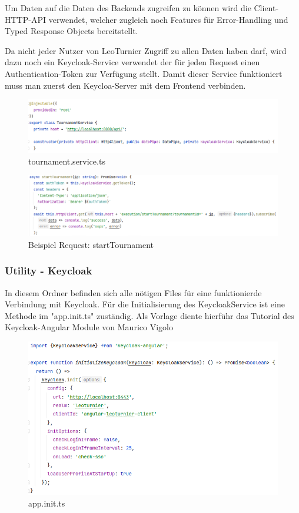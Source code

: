 Um Daten auf die Daten des Backends zugreifen zu können wird die Client-HTTP-API verwendet, welcher zugleich noch Features für Error-Handling und Typed Response Objects  bereitstellt. \cite{implementation-angular-4}

Da nicht jeder Nutzer von LeoTurnier Zugriff zu allen Daten haben darf, wird dazu noch ein Keycloak-Service verwendet der für jeden Request einen Authentication-Token zur Verfügung stellt.
Damit dieser Service funktioniert muss man zuerst den Keycloa-Server mit dem Frontend verbinden.

\begin{figure}[H]
    \includegraphics[scale=0.6]{pics/frontend/service.PNG}
    \caption{tournament.service.ts}
\end{figure}

\begin{figure}[H]
    \includegraphics[scale=0.6]{pics/frontend/example_request.PNG}
    \caption{Beispiel Request: startTournament}
\end{figure}

\subsubsection{Utility - Keycloak}

In diesem Ordner befinden sich alle nötigen Files für  eine funktionierde Verbindung mit Keycloak.
Für die Initialisierung des KeycloakService ist eine Methode im "app.init.ts" zuständig. Als Vorlage diente hierführ
das Tutorial des Keycloak-Angular Module von Maurico Vigolo
\cite{sysarch-keycloak-angular-1}

\begin{figure}[H]
    \includegraphics[scale=0.6]{pics/frontend/app_init.PNG}
    \caption{app.init.ts}
\end{figure}

